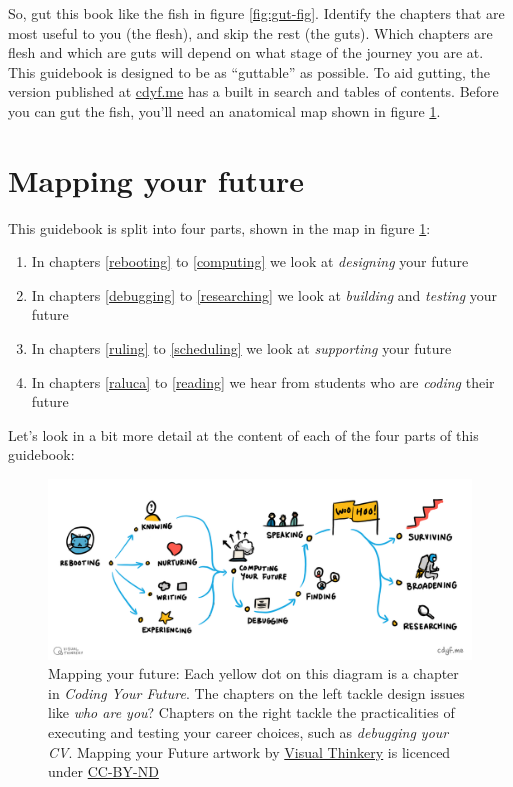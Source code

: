 \documentclass[
]{book}
\providecommand{\tightlist}{%
  \setlength{\itemsep}{0pt}\setlength{\parskip}{0pt}}
\begin{document}
So, gut this book like the fish in figure \ref{fig:gut-fig}. Identify the chapters that are most useful to you (the flesh), and skip the rest (the guts). Which chapters are flesh and which are guts will depend on what stage of the journey you are at. This guidebook is designed to be as ``guttable'' as possible. To aid gutting, the version published at \href{https://www.cdyf.me/}{cdyf.me} has a built in search and tables of contents. Before you can gut the fish, you'll need an anatomical map shown in figure \ref{fig:map-fig}.

\hypertarget{mapping}{%
\section{Mapping your future}\label{mapping}}

This guidebook is split into four parts, shown in the map in figure \ref{fig:map-fig}:

\begin{enumerate}
\def\labelenumi{\arabic{enumi}.}
\tightlist
\item
  In chapters \ref{rebooting} to \ref{computing} we look at \emph{designing} your future
\item
  In chapters \ref{debugging} to \ref{researching} we look at \emph{building} and \emph{testing} your future
\item
  In chapters \ref{ruling} to \ref{scheduling} we look at \emph{supporting} your future
\item
  In chapters \ref{raluca} to \ref{reading} we hear from students who are \emph{coding} their future
\end{enumerate}

Let's look in a bit more detail at the content of each of the four parts of this guidebook:

\begin{figure}

{\centering \includegraphics[width=1\linewidth]{images/Course Map V3} 

}

\caption{Mapping your future: Each yellow dot on this diagram is a chapter in \emph{Coding Your Future}. The chapters on the left tackle design issues like \emph{who are you}? Chapters on the right tackle the practicalities of executing and testing your career choices, such as \emph{debugging your CV}. Mapping your Future artwork by \href{https://visualthinkery.com/}{Visual Thinkery} is licenced under \href{https://creativecommons.org/licenses/by-nd/4.0/}{CC-BY-ND}}\label{fig:map-fig}
\end{figure}
\end{document}
